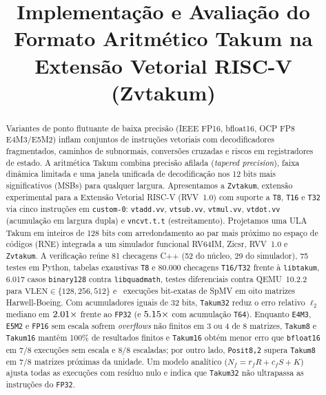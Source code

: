 \documentclass[conference]{IEEEtran}
\author{\IEEEauthorblockN{Andr\'e Lu\'is Alves Rezende, Gabriel Ramos Fontes,
Isadora Maria Carvalho Lopes, Jo\~ao Pedro Santos de Brito}
\IEEEauthorblockA{Departamento de Engenharia Eletr\^onica (DELT), Universidade Federal de Minas Gerais (UFMG)\\
Belo Horizonte, MG, Brasil}}
\title{Implementa\c{c}\~ao e Avalia\c{c}\~ao do Formato Aritm\'etico Takum na Extens\~ao Vetorial RISC-V (Zvtakum)}
\begin{document}
\renewcommand{\abstractname}{Resumo}
\renewcommand{\IEEEkeywordsname}{Palavras-chave}
\renewcommand{\refname}{Refer\^encias}
\renewcommand{\figurename}{Fig.}
\renewcommand{\tablename}{TABELA}
\maketitle

\begin{abstract}
Variantes de ponto flutuante de baixa precis\~ao (IEEE FP16, bfloat16, OCP FP8 E4M3/E5M2) inflam conjuntos de instru\c{c}\~oes vetoriais com decodificadores fragmentados, caminhos de subnormais, convers\~oes cruzadas e riscos em registradores de estado. A aritm\'etica Takum combina precis\~ao afilada (\emph{tapered precision}), faixa din\^amica limitada e uma janela unificada de decodifica\c{c}\~ao nos 12 bits mais significativos (MSBs) para qualquer largura. Apresentamos a \texttt{Zvtakum}, extens\~ao experimental para a Extens\~ao Vetorial RISC-V (RVV~1.0) com suporte a \texttt{T8}, \texttt{T16} e \texttt{T32} via cinco instru\c{c}\~oes em \texttt{custom-0}: \texttt{vtadd.vv}, \texttt{vtsub.vv}, \texttt{vtmul.vv}, \texttt{vtdot.vv} (acumula\c{c}\~ao em largura dupla) e \texttt{vncvt.t.t} (estreitamento). Projetamos uma ULA Takum em inteiros de 128 bits com arredondamento ao par mais pr\'oximo no espa\c{c}o de c\'odigos (RNE) integrada a um simulador funcional RV64IM, Zicsr, RVV~1.0 e \texttt{Zvtakum}. A verifica\c{c}\~ao re\'une 81 checagens C++ (52 do n\'ucleo, 29 do simulador), 75 testes em Python, tabelas exaustivas \texttt{T8} e 80.000 checagens \texttt{T16/T32} frente \`a \texttt{libtakum}, 6.017 casos \texttt{binary128} contra \texttt{libquadmath}, testes diferenciais contra QEMU~10.2.2 para $\mathrm{VLEN}\in\{128,256,512\}$ e \NumExecSpmv\ execu\c{c}\~oes bit-exatas de SpMV em oito matrizes Harwell-Boeing. Com acumuladores iguais de 32 bits, \texttt{Takum32} reduz o erro relativo $\ell_2$ mediano em $2.01\times$ frente ao \texttt{FP32} (e $5.15\times$ com acumula\c{c}\~ao \texttt{T64}). Enquanto \texttt{E4M3}, \texttt{E5M2} e \texttt{FP16} sem escala sofrem \emph{overflows} n\~ao finitos em 3 ou 4 de 8 matrizes, \texttt{Takum8} e \texttt{Takum16} mant\^em 100\% de resultados finitos e \texttt{Takum16} obt\'em menor erro que \texttt{bfloat16} em 7/8 execu\c{c}\~oes sem escala e 8/8 escaladas; por outro lado, \texttt{Posit8,2} supera \texttt{Takum8} em 7/8 matrizes pr\'oximas da unidade. Um modelo anal\'itico ($N_f = r_f R + c_f S + K$) ajusta todas as execu\c{c}\~oes com res\'iduo nulo e indica que \texttt{Takum32} n\~ao ultrapassa as instru\c{c}\~oes do \texttt{FP32}.
\end{abstract}
\end{document}
